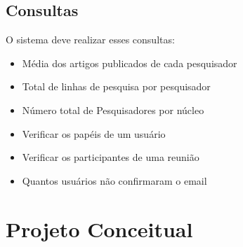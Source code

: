 \documentclass[11pt]{../../classes/ifscarticle}
\begin{document}
\subsection{Consultas}


O sistema deve realizar esses consultas:
\begin{itemize}
    
    \item Média dos artigos publicados de cada pesquisador
    \item Total de linhas de pesquisa por pesquisador
    \item Número total de Pesquisadores por núcleo
    \item Verificar os papéis de um usuário 
    \item Verificar os participantes de uma reunião
    \item Quantos usuários não confirmaram o email
\end{itemize}

\clearpage

\section{Projeto Conceitual}
\end{document}
